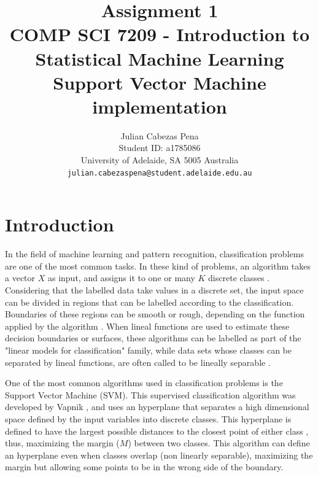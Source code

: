 \documentclass[11pt,twocolumn,letterpaper]{article}
\begin{document}
\title{Assignment 1 \\ COMP SCI 7209 - Introduction to Statistical Machine Learning\\ Support Vector Machine implementation}

\author{Julian Cabezas Pena\\
Student ID: a1785086\\
University of Adelaide, SA 5005 Australia\\
{\tt\small julian.cabezaspena@student.adelaide.edu.au}
}

\maketitle


\section{Introduction}

In the field of machine learning  and pattern recognition, classification problems are one of the most common tasks. In these kind of problems, an algorithm takes a vector $X$ as input, and assigns it to one or many $K$ discrete classes \cite{Bishop2006}. Considering that the labelled data take values in a discrete set, the input space can be divided in regions that can be labelled according to the classification. Boundaries of these regions can be smooth or rough, depending on the function applied by the algorithm \cite{Hastie2009}. When lineal functions are used to estimate these decision boundaries or surfaces, these algorithms can be labelled as part of the "linear models for classification" family, while data sets whose classes can be separated by lineal functions, are often called to be lineally separable \cite{Bishop2006}.

One of the most common algorithms used in classification problems is the Support Vector Machine (SVM). This supervised classification algorithm was developed by Vapnik \cite{Vapnik1995}, and uses an hyperplane that separates a high dimensional space defined by the input variables into discrete classes. This hyperplane is defined to have the largest possible distances to the closest point of either class \cite{Hastie2009}, thus, maximizing the margin ($M$) between two classes. This algorithm can define an hyperplane even when classes overlap (non linearly separable), maximizing the margin but allowing some points to be in the wrong side of the boundary.
\end{document}
